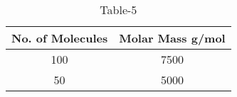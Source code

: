 \begin{table}[htbp]
\centering
\caption{Table-5}
\label{tab:tables/table6.tex}
\begin{tabular}{c|c}
\textbf{No. of Molecules} & \textbf{Molar Mass g/mol} \\ \hline
100 & 7500 \\
50 & 5000 \\

\end{tabular}
\end{table}